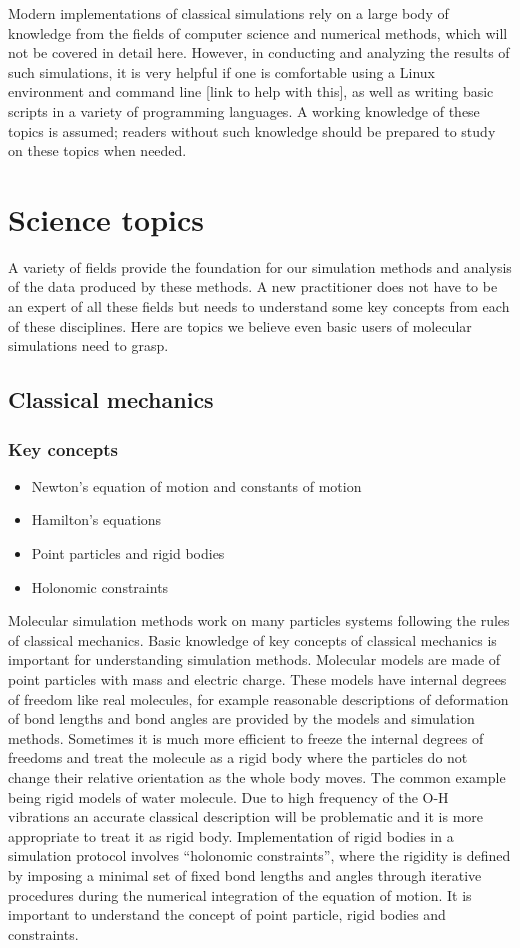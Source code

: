 \documentclass[9pt,bestpractices]{livecoms}
\begin{document}
Modern implementations of classical simulations rely on a large body of knowledge from the fields of computer science and numerical methods, which will not be covered in detail here. However, in conducting and analyzing the results of such simulations, it is very helpful if one is comfortable using a Linux environment and command line [link to help with this], as well as writing basic scripts in a variety of programming languages. A working knowledge of these topics is assumed; readers without such knowledge should be prepared to study on these topics when needed.



\section{Science topics}
A variety of fields provide the foundation for our simulation methods and analysis of the data produced by these methods. A new practitioner does not have to be an expert of all these fields but needs to understand some key concepts from each of these disciplines. Here are topics we believe even basic users of molecular simulations need to grasp.

\subsection{Classical mechanics}
\subsubsection{Key concepts}
\begin{itemize}
\item Newton’s equation of motion and constants of motion
\item Hamilton’s equations
\item Point particles and rigid bodies
\item Holonomic constraints
\end{itemize}

Molecular simulation methods work on many particles systems following the rules of classical mechanics. Basic knowledge of key concepts of classical mechanics is important for understanding simulation methods. Molecular models are made of point particles with mass and electric charge. These models have internal degrees of freedom like real molecules, for example reasonable descriptions of deformation of bond lengths and bond angles are provided by the models and simulation methods. Sometimes it is much more efficient to freeze the internal degrees of freedoms and treat the molecule as a rigid body where the particles do not change their relative orientation as the whole body moves. The common example being rigid models of water molecule. Due to high frequency of the O-H vibrations an accurate classical description will be problematic and it is more appropriate to treat it as rigid body. Implementation of rigid bodies in a simulation protocol involves “holonomic constraints”, where the rigidity is defined by imposing a minimal set of fixed bond lengths and angles through iterative procedures during the numerical integration of the equation of motion. It is important to understand the concept of point particle, rigid bodies and constraints.
\end{document}
